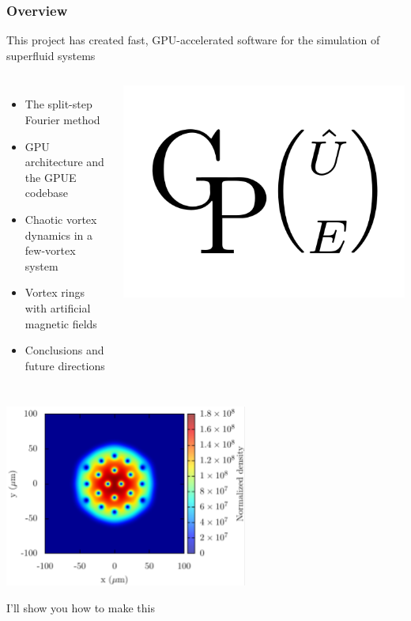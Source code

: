 \documentclass{beamer}
\begin{document}
\begin{frame}
\frametitle{Overview}
This project has created fast, GPU-accelerated software for the simulation of superfluid systems
\begin{columns}
\begin{itemize}
\item The split-step Fourier method
\item GPU architecture and the GPUE codebase
\item Chaotic vortex dynamics in a few-vortex system
\item Vortex rings with artificial magnetic fields
\item Conclusions and future directions
\end{itemize}

\includegraphics[width=\textwidth]{GPUE.png}
\end{columns}
\end{frame}

\begin{frame}

\pause
\begin{center}
\includegraphics[width=0.6\textwidth]{../data/splitop/rot/density_L10.pdf}

I'll show you how to make this
\end{center}
\end{frame}
\end{document}
